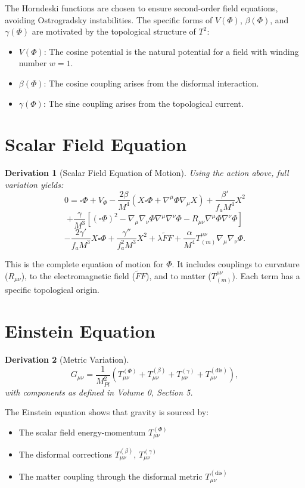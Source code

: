 \documentclass[12pt,oneside]{book}
\newtheorem{derivation}{Derivation}[chapter]
\begin{document}
The Horndeski functions are chosen to ensure second-order field equations, avoiding Ostrogradsky instabilities. The specific forms of $V(\Phi)$, $\beta(\Phi)$, and $\gamma(\Phi)$ are motivated by the topological structure of $T^2$:
\begin{itemize}
    \item $V(\Phi)$: The cosine potential is the natural potential for a field with winding number $w=1$.
    \item $\beta(\Phi)$: The cosine coupling arises from the disformal interaction.
    \item $\gamma(\Phi)$: The sine coupling arises from the topological current.
\end{itemize}

\section{Scalar Field Equation}

\begin{derivation}[Scalar Field Equation of Motion]
Using the action above, full variation yields:
\[
0 = \square\Phi + V_\Phi - \frac{2\beta}{M^4}\left(X\square\Phi + \nabla^\mu\Phi \nabla_\mu X\right) + \frac{\beta'}{f_a M^4} X^2
\]
\[
+ \frac{\gamma}{M^3}\left[(\square\Phi)^2 - \nabla_\mu\nabla_\nu\Phi \nabla^\mu\nabla^\nu\Phi - R_{\mu\nu}\nabla^\mu\Phi \nabla^\nu\Phi \right]
\]
\[
- \frac{2\gamma'}{f_a M^3} X\square\Phi + \frac{\gamma''}{f_a^2 M^3} X^2 + \lambda \tilde{F}F + \frac{\alpha}{M^4} T_{(m)}^{\mu\nu}\nabla_\mu\nabla_\nu\Phi.
\]
\end{derivation}

This is the complete equation of motion for $\Phi$. It includes couplings to curvature ($R_{\mu\nu}$), to the electromagnetic field ($\tilde{F}F$), and to matter ($T_{(m)}^{\mu\nu}$). Each term has a specific topological origin.

\section{Einstein Equation}

\begin{derivation}[Metric Variation]
\[
G_{\mu\nu} = \frac{1}{M_{Pl}^2} \left( T_{\mu\nu}^{(\Phi)} + T_{\mu\nu}^{(\beta)} + T_{\mu\nu}^{(\gamma)} + T_{\mu\nu}^{(\text{dis})} \right),
\]
with components as defined in Volume 0, Section 5.
\end{derivation}

The Einstein equation shows that gravity is sourced by:
\begin{itemize}
    \item The scalar field energy-momentum $T_{\mu\nu}^{(\Phi)}$
    \item The disformal corrections $T_{\mu\nu}^{(\beta)}$, $T_{\mu\nu}^{(\gamma)}$
    \item The matter coupling through the disformal metric $T_{\mu\nu}^{(\text{dis})}$
\end{itemize}
\end{document}
